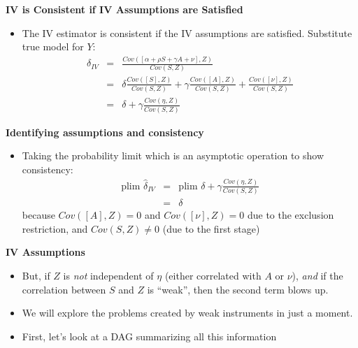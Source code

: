 \documentclass[notes=show]{beamer}
\begin{document}
\begin{frame}[plain]

	\begin{center}
	\textbf{IV is Consistent if IV Assumptions are Satisfied}
	\end{center}
	
	\begin{itemize}
	\item The IV estimator is consistent if the IV assumptions are satisfied.  Substitute true model for $Y$:
		\begin{eqnarray*}
		\delta_{IV} &=& \frac{Cov([\alpha + \rho{S} + \gamma{A} + \nu],Z)}{Cov(S,Z)} \\
			&=& \delta \frac{Cov([S],Z)}{Cov(S,Z)} + \gamma \frac{Cov([A],Z)}{Cov(S,Z)} + \frac{Cov([\nu],Z)}{Cov(S,Z)} \\
			&=& \delta + \gamma \frac{Cov(\eta,Z)}{Cov(S,Z)}
		\end{eqnarray*}
	\end{itemize}
\end{frame}

\begin{frame}[plain]
\begin{center}
\textbf{Identifying assumptions and consistency}
\end{center}

\begin{itemize}
	\item Taking the probability limit which is an asymptotic operation to show consistency:\begin{eqnarray*}
	\text{plim }\widehat{\delta}_{IV}&=& \text{plim } \delta + \gamma \frac{Cov(\eta,Z)}{Cov(S,Z)} \\
	&=&\delta
	\end{eqnarray*}because $Cov([A],Z)=0$ and $Cov([\nu],Z)=0$ due to the exclusion restriction, and $Cov(S,Z)\neq{0}$ (due to the first stage)
\end{itemize}

\end{frame}

\begin{frame}[plain]
\begin{center}
\textbf{IV Assumptions}
\end{center}

\begin{itemize}
	\item But, if $Z$ is \emph{not} independent of $\eta$ (either correlated with $A$ or $\nu$), \emph{and} if the correlation between $S$ and $Z$ is ``weak'', then the second term blows up. 
	\item We will explore the problems created by weak instruments in just a moment. 
	\item First, let's look at a DAG summarizing all this information

\end{itemize}

\end{frame}
\end{document}
